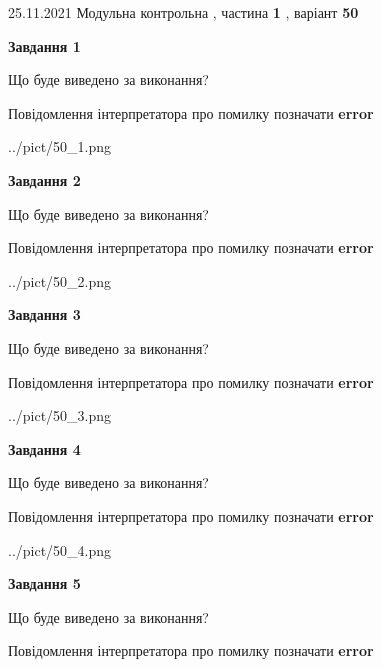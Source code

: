 \documentclass[10pt, ukrainian]{article}
\begin{document}
{25.11.2021 Модульна контрольна , частина \textbf { 1 }, варіант  \No \textbf { 50 }\par}
{
\begin {large}

{\begin {center}\textbf{Завдання 1}\end {center}}\par
Що буде виведено за виконання? \par
Повідомлення інтерпретатора про помилку позначати \textbf{error}

\begin{center}
	{../pict/50_1.png}
\end{center}
\newpage

{\begin {center}\textbf{Завдання 2}\end {center}}\par
Що буде виведено за виконання? \par
Повідомлення інтерпретатора про помилку позначати \textbf{error}

\begin{center}
	{../pict/50_2.png}
\end{center}
\newpage

{\begin {center}\textbf{Завдання 3}\end {center}}\par
Що буде виведено за виконання? \par
Повідомлення інтерпретатора про помилку позначати \textbf{error}

\begin{center}
	{../pict/50_3.png}
\end{center}
\newpage

{\begin {center}\textbf{Завдання 4}\end {center}}\par
Що буде виведено за виконання? \par
Повідомлення інтерпретатора про помилку позначати \textbf{error}

\begin{center}
	{../pict/50_4.png}
\end{center}
\newpage

{\begin {center}\textbf{Завдання 5}\end {center}}\par
Що буде виведено за виконання? \par
Повідомлення інтерпретатора про помилку позначати \textbf{error}


\end{large}}
\end{document}

